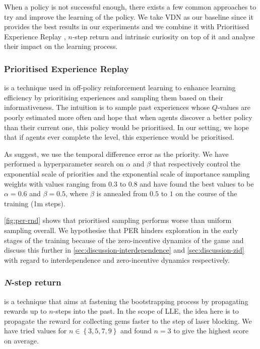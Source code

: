 When a policy is not successful enough, there exists a few common approaches to try and improve the learning of the policy. We take VDN as our baseline since it provides the best results in our experiments and we combine it with Prioritised Experience Replay \citep[PER]{schaul_prioritized_2016_per}, $n$-step return \citep{Watkins_1989_n-step-return} and intrinsic curiosity \citep{jurgen_schmidhuber_possibility_1991_curiosity} on top of it and analyse their impact on the learning process.

\subsubsection{Prioritised Experience Replay} is a technique used in off-policy reinforcement learning to enhance learning efficiency by prioritising experiences and sampling them based on their informativeness. The intuition is to sample past experiences whose $Q$-values are poorly estimated more often and hope that when agents discover a better policy than their current one, this policy would be prioritised. In our setting, we hope that if agents ever complete the level, this experience would be prioritised.

As \citeauthor{schaul_prioritized_2016_per} suggest, we use the temporal difference error as the priority. We have performed a hyperparameter search on $\alpha$ and $\beta$ that respectively control the  exponential scale of priorities and the exponential scale of importance sampling weights with values ranging from 0.3 to 0.8 and have found the best values to be $\alpha=0.6$ and $\beta=0.5$, where $\beta$ is annealed from $0.5$ to $1$ on the course of the training (1m steps).

\autoref{fig:per-rnd} shows that prioritised sampling performs worse than uniform sampling overall. We hypothesise that PER hinders exploration in the early stages of the training because of the zero-incentive dynamics of the game and discuss this further in \autoref{sec:discussion-interdependence} and \autoref{sec:discussion-zid} with regard to interdependence and zero-incentive dynamics respectively. 

\subsubsection{\textit{N}-step return} is a technique that aims at fastening the bootstrapping process \citep{sutton_barto_2018_rlbook} by propagating rewards up to $n$-steps into the past. In the scope of LLE, the idea here is to propagate the reward for collecting gems faster to the step of laser blocking. We have tried values for $n \in \left\{3, 5, 7, 9 \right\}$ and found $n=3$ to give the highest score on average.

